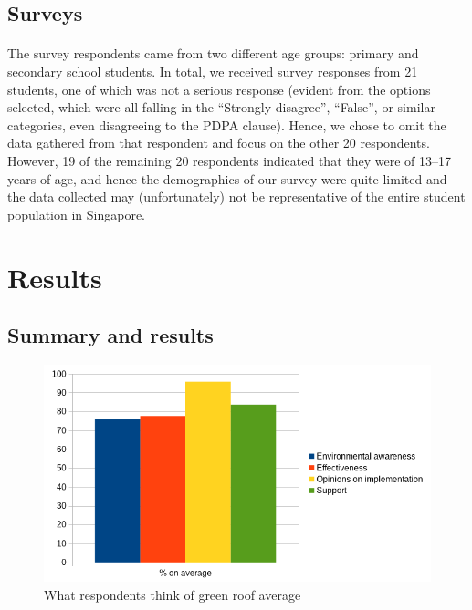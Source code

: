 \documentclass{article}
\begin{document}
\begin{multicols}{2}
  \subsection{Surveys}
  \paragraph{} The survey respondents came from two different age groups:
  primary and secondary school students. In total, we received survey
  responses from 21 students, one of which was not a serious response
  (evident from the options selected, which were all falling in the
    ``Strongly disagree'', ``False'', or similar categories, even disagreeing
  to the PDPA clause). Hence, we chose to omit the data gathered from
  that respondent and focus on the other 20 respondents. However, 19 of
  the remaining 20 respondents indicated that they were of 13--17 years
  of age, and hence the demographics of our survey were quite limited
  and the data collected may (unfortunately) not be representative of
  the entire student population in Singapore.


  \section{Results}
  \subsection{Summary and results}

  \begin{figure}
    \includegraphics[width=\linewidth]{responses-ave.png}
    \caption{What respondents think of green roof average}
    \label{fig:surv-resp}
  \end{figure}


\end{multicols}
\end{document}
